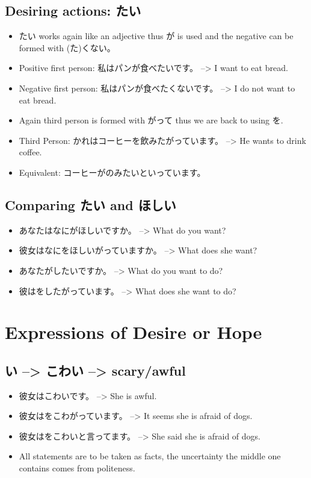 \documentclass{article}
\begin{document}
\subsection{Desiring actions: たい}
\begin{itemize}
\item たい works again like an adjective thus が is used and the negative can be formed with (た)くない。
\item Positive first person: 私はパンが食べたいです。 --> I want to eat bread.
\item Negative first person: 私はパンが食べたくないです。 --> I do not want to eat bread. \\
\item Again third person is formed with がって thus we are back to using を.
\item Third Person: かれはコーヒーを飲みたがっています。 --> He wants to drink coffee.
\item Equivalent: コーヒーがのみたいといっています。
\end{itemize}
\subsection{Comparing たい and  ほしい}
\begin{itemize}
\item あなたはなにがほしいですか。 --> What do you want?
\item 彼女はなにをほしいがっていますか。 --> What does she want?
\item あなたがしたいですか。 --> What do you want to do?
\item 彼はをしたがっています。 --> What does she want to do?
\end{itemize}
\section{Expressions of Desire or Hope}
\subsection{い --> こわい --> scary/awful }
\begin{itemize}
\item 彼女はこわいです。 --> She is awful.
\item 彼女はをこわがっています。 --> It seems she is afraid of dogs.
\item 彼女はをこわいと言ってます。 --> She said she is afraid of dogs.
\item All statements are to be taken as facts, the uncertainty the middle one contains comes from politeness.
\end{itemize}
\end{document}
